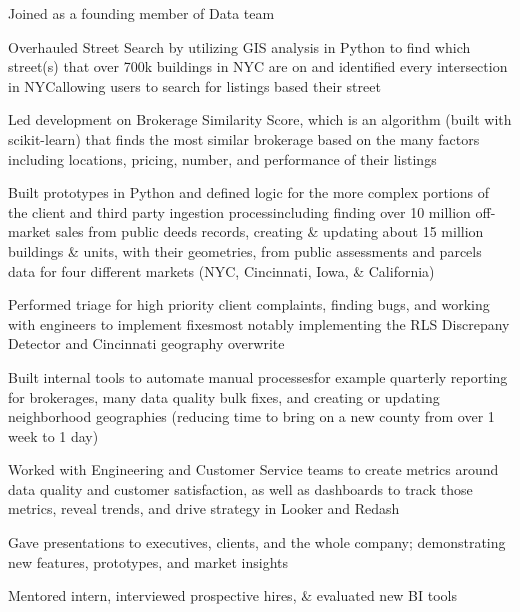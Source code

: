 \documentclass[a4paper]{deedy-resume-openfont} %
\begin{document}
\begin{minipage}[t]{0.66\textwidth}
\begin{tightitemize}
	\item Joined as a founding member of Data team
    \item Overhauled Street Search by utilizing GIS analysis in Python to find which street(s) that over 700k buildings in NYC are on and identified every intersection in NYC\textemdash allowing users to search for listings based their street
    \item Led development on Brokerage Similarity Score, which is an algorithm (built with scikit-learn) that finds the most similar brokerage based on the many factors including locations, pricing, number, and performance of their listings
    \item Built prototypes in Python and defined logic for the more complex portions of the client and third party ingestion process\textemdash including finding over 10 million off-market sales from public deeds records, creating \& updating about 15 million buildings \& units, with their geometries, from public assessments and parcels data for four different markets (NYC, Cincinnati, Iowa, \& California)
    \item Performed triage for high priority client complaints, finding bugs, and working with engineers to implement fixes\textemdash most notably implementing the RLS Discrepany Detector and Cincinnati geography overwrite
    \item Built internal tools to automate manual processes\textemdash for example quarterly reporting for brokerages, many data quality bulk fixes, and creating or updating neighborhood geographies (reducing time to bring on a new county from over 1 week to 1 day)
    \item Worked with Engineering and Customer Service teams to create metrics around data quality and customer satisfaction, as well as dashboards to track those metrics, reveal trends, and drive strategy in Looker and Redash
    \item Gave presentations to executives, clients, and the whole company; demonstrating new features, prototypes, and market insights
    \item Mentored intern, interviewed prospective hires, \& evaluated new BI tools
\end{tightitemize}


\end{minipage}
\end{document}
